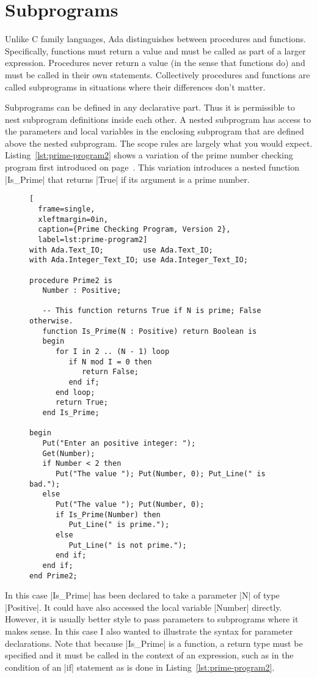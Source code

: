 \section{Subprograms}

Unlike C family languages, Ada distinguishes between procedures and functions. Specifically,
functions must return a value and must be called as part of a larger expression. Procedures
never return a value (in the sense that functions do) and must be called in their own
statements. Collectively procedures and functions are called subprograms in situations where
their differences don't matter.

Subprograms can be defined in any declarative part. Thus it is permissible to nest subprogram
definitions inside each other. A nested subprogram has access to the parameters and local
variables in the enclosing subprogram that are defined above the nested subprogram. The scope
rules are largely what you would expect. Listing~\ref{lst:prime-program2} shows a variation of
the prime number checking program first introduced on page~\pageref{lst:prime-program}. This
variation introduces a nested function |Is_Prime| that returns |True| if its argument is a prime
number.

\begin{figure}[tbhp]
\begin{lstlisting}[
  frame=single,
  xleftmargin=0in,
  caption={Prime Checking Program, Version 2},
  label=lst:prime-program2]
with Ada.Text_IO;         use Ada.Text_IO;
with Ada.Integer_Text_IO; use Ada.Integer_Text_IO;

procedure Prime2 is
   Number : Positive;

   -- This function returns True if N is prime; False otherwise.
   function Is_Prime(N : Positive) return Boolean is
   begin
      for I in 2 .. (N - 1) loop
         if N mod I = 0 then
            return False;
         end if;
      end loop;
      return True;
   end Is_Prime;

begin
   Put("Enter an positive integer: ");
   Get(Number);
   if Number < 2 then
      Put("The value "); Put(Number, 0); Put_Line(" is bad.");
   else
      Put("The value "); Put(Number, 0);
      if Is_Prime(Number) then
         Put_Line(" is prime.");
      else
         Put_Line(" is not prime.");
      end if;
   end if;
end Prime2;
\end{lstlisting}
\end{figure}

In this case |Is_Prime| has been declared to take a parameter |N| of type |Positive|. It could
have also accessed the local variable |Number| directly. However, it is usually better style to
pass parameters to subprograms where it makes sense. In this case I also wanted to illustrate
the syntax for parameter declarations. Note that because |Is_Prime| is a function, a return type
must be specified and it must be called in the context of an expression, such as in the
condition of an |if| statement as is done in Listing~\ref{lst:prime-program2}.


